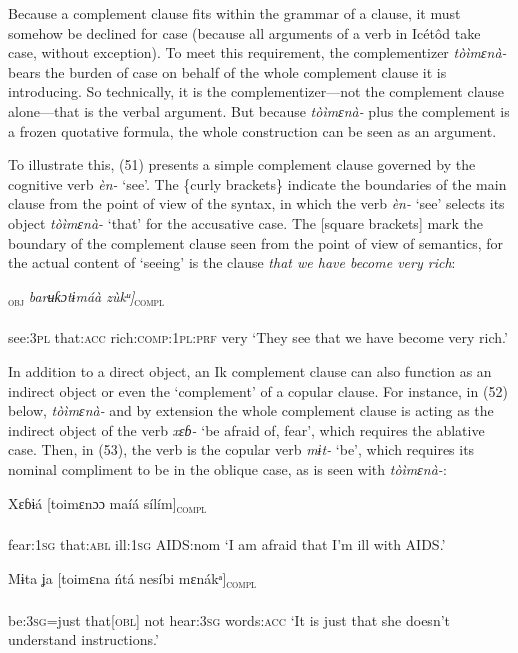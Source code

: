Because a complement clause fits within the grammar of a clause, it must somehow be declined for case (because all arguments of a verb in Icétôd take case, without exception). To meet this requirement, the complementizer \textit{tòìmɛnà-} bears the burden of case on behalf of the whole complement clause it is introducing. So technically, it is the complementizer—not the complement clause alone—that is the verbal argument. But because \textit{tòìmɛnà-} plus the complement is a frozen quotative formula, the whole construction can be seen as an argument.

To illustrate this, (51) presents a simple complement clause governed by the cognitive verb \textit{èn-} ‘see’. The \{curly brackets\} indicate the boundaries of the main clause from the point of view of the syntax, in which the verb \textit{èn-} ‘see’ selects its object \textit{tòìmɛnà-} ‘that’ for the accusative case. The [square brackets] mark the boundary of the complement clause seen from the point of view of semantics, for the actual content of ‘seeing’ is the clause \textit{that we have become very rich}:




\ea\label{ex:}
\gll {\{Enáta  [toimɛnaa\}}\textsc{\textsubscript{obj}}\textit{ barʉƙɔtɨmáà   zùkᵘ]}\textsc{\textsubscript{compl}} \\
    \\
see:\textsc{3pl}   that:\textsc{acc}    rich:\textsc{comp:1pl:prf}   very
\glt ‘They see that we have become very rich.’ 
\z


In addition to a direct object, an Ik complement clause can also function as an indirect object or even the ‘complement’ of a copular clause. For instance, in (52) below, \textit{tòìmɛnà-} and by extension the whole complement clause is acting as the indirect object of the verb \textit{xɛɓ-} ‘be afraid of, fear’, which requires the ablative case. Then, in (53), the verb is the copular verb \textit{mɨt-} ‘be’, which requires its nominal compliment to be in the oblique case, as is seen with \textit{tòìmɛnà-}:



\ea\label{ex:}
\gll Xɛɓɨá     [toimɛnɔɔ   maíá     sílím]\textsc{\textsubscript{compl}} \\
    \\
fear:\textsc{1sg}   that:\textsc{abl}   ill:\textsc{1sg}   AIDS:nom
\glt ‘I am afraid that I’m ill with AIDS.’ 
\z




\ea\label{ex:}
\gll Mɨta ʝa   [toimɛna   ńtá   nesíbi       mɛnákᵃ]\textsc{\textsubscript{compl}} \\
    \\
be:\textsc{3sg}=just   that[\textsc{obl}]   not   hear:\textsc{3sg} words:\textsc{acc}
\glt ‘It is just that she doesn’t understand instructions.’ 
\z






